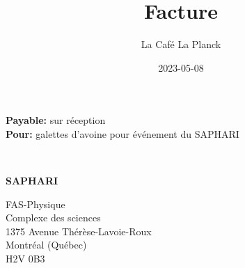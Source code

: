 \documentclass{CSMinimalInvoice}
\title{Facture \nofacture}
\author{La Café La Planck}
\date{2023-05-08}
\newcommand{\espacesection}{\begin{minipage}[t]{0.03\textwidth}
	~ %
\end{minipage}}
\begin{document}
\outputinvoicenum

\begin{minipage}[t]{0.38\textwidth}
\textbf{Payable:} sur réception\\
\textbf{Pour:} galettes d'avoine pour événement du SAPHARI\\
\end{minipage}
\espacesection
\begin{minipage}[t]{0.56\textwidth}
\textbf{SAPHARI}

FAS-Physique\\
Complexe des sciences\\
1375 Avenue Thérèse-Lavoie-Roux\\
Montréal (Québec)\\
H2V 0B3
\end{minipage}

\vfill



\begin{invoicetable}
\end{invoicetable}

\vfill\vfill

\end{document}

